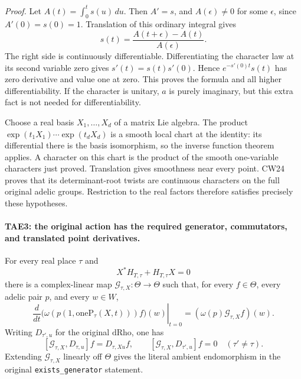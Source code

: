 \emph{Proof.}
Let \(A(t)=\int_0^t s(u)\,du\).  Then \(A'=s\), and
\(A(\epsilon)\ne0\) for some \(\epsilon\), since
\(A'(0)=s(0)=1\).  Translation of this ordinary integral gives
\[
 s(t)=\frac{A(t+\epsilon)-A(t)}{A(\epsilon)}.
 \tag{TAE.12}
\]
The right side is continuously differentiable.  Differentiating
the character law at its second variable zero gives
\(s'(t)=s(t)s'(0)\).  Hence
\(e^{-s'(0)t}s(t)\) has zero derivative and value one at zero.
This proves the formula and all higher differentiability.
If the character is unitary, \(a\) is purely imaginary, but this
extra fact is not needed for differentiability.

Choose a real basis \(X_1,\ldots,X_d\) of a matrix Lie algebra.
The product
\(\exp(t_1X_1)\cdots\exp(t_dX_d)\) is a smooth local chart at the
identity: its differential there is the basis isomorphism, so the
inverse function theorem applies.  A character on this chart
is the product of the smooth one-variable characters just proved.
Translation gives smoothness near every point.  CW24 proves that
its determinant-root twists are continuous characters on the
full original adelic groups.  Restriction to the real factors
therefore satisfies precisely these hypotheses.

\paragraph{TAE3: the original action has the required generator, commutators, and translated point derivatives.}
\label{claim:TAE3}
For every real place \(\tau\) and
\[
 X^*H_{T,\tau}+H_{T,\tau}X=0
 \tag{TAE.13}
\]
there is a complex-linear map \(\mathcal G_{\tau,X}:\Theta\to\Theta\)
such that, for every \(f\in\Theta\), every adelic pair \(p\), and
every \(w\in W\),
\[
 \left.\frac{d}{dt}
  \bigl(\omega(p(1,\mathrm{oneP}_\tau(X,t)))f\bigr)(w)
       \right|_{t=0}
       =(\omega(p)\mathcal G_{\tau,X}f)(w).
 \tag{TAE.14}
\]
Writing \(D_{\tau',u}\) for the original \(\mathrm{dRho}\), one has
\[
 [\mathcal G_{\tau,X},D_{\tau,u}]f=D_{\tau,Xu}f,
 \qquad
 [\mathcal G_{\tau,X},D_{\tau',u}]f=0\quad(\tau'\ne\tau).
 \tag{TAE.15}
\]
Extending \(\mathcal G_{\tau,X}\) linearly off \(\Theta\) gives
the literal ambient endomorphism in the original
\texttt{exists\_\allowbreak generator} statement.

